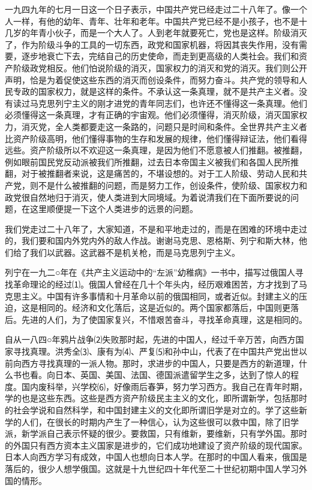 \documentclass[UTF-8, a5paper, 12pt]{ctexart}
\begin{document}
一九四九年的七月一日这一个日子表示，中国共产党已经走过二十八年了。像一个人一样，有他的幼年、青年、壮年和老年。中国共产党已经不是小孩子，也不是十几岁的年青小伙子，而是一个大人了。人到老年就要死亡，党也是这样。阶级消灭了，作为阶级斗争的工具的一切东西，政党和国家机器，将因其丧失作用，没有需要，逐步地衰亡下去，完结自己的历史使命，而走到更高级的人类社会。我们和资产阶级政党相反。他们怕说阶级的消灭，国家权力的消灭和党的消灭。我们则公开声明，恰是为着促使这些东西的消灭而创设条件，而努力奋斗。共产党的领导和人民专政的国家权力，就是这样的条件。不承认这一条真理，就不是共产主义者。没有读过马克思列宁主义的刚才进党的青年同志们，也许还不懂得这一条真理。他们必须懂得这一条真理，才有正确的宇宙观。他们必须懂得，消灭阶级，消灭国家权力，消灭党，全人类都要走这一条路的，问题只是时间和条件。全世界共产主义者比资产阶级高明，他们懂得事物的生存和发展的规律，他们懂得辩证法，他们看得远些。资产阶级所以不欢迎这一条真理，是因为他们不愿意被人们推翻。被推翻，例如眼前国民党反动派被我们所推翻，过去日本帝国主义被我们和各国人民所推翻，对于被推翻者来说，这是痛苦的，不堪设想的。对于工人阶级、劳动人民和共产党，则不是什么被推翻的问题，而是努力工作，创设条件，使阶级、国家权力和政党很自然地归于消灭，使人类进到大同境域。为着说清我们在下面所要说的问题，在这里顺便提一下这个人类进步的远景的问题。

我们党走过二十八年了，大家知道，不是和平地走过的，而是在困难的环境中走过的，我们要和国内外党内外的敌人作战。谢谢马克思、恩格斯、列宁和斯大林，他们给了我们以武器。这武器不是机关枪，而是马克思列宁主义。

列宁在一九二○年在《共产主义运动中的“左派”幼稚病》一书中，描写过俄国人寻找革命理论的经过⑴。俄国人曾经在几十个年头内，经历艰难困苦，方才找到了马克思主义。中国有许多事情和十月革命以前的俄国相同，或者近似。封建主义的压迫，这是相同的。经济和文化落后，这是近似的。两个国家都落后，中国则更落后。先进的人们，为了使国家复兴，不惜艰苦奋斗，寻找革命真理，这是相同的。

自从一八四○年鸦片战争⑵失败那时起，先进的中国人，经过千辛万苦，向西方国家寻找真理。洪秀全⑶、康有为⑷、严复⑸和孙中山，代表了在中国共产党出世以前向西方寻找真理的一派人物。那时，求进步的中国人，只要是西方的新道理，什么书也看。向日本、英国、美国、法国、德国派遣留学生之多，达到了惊人的程度。国内废科举，兴学校⑹，好像雨后春笋，努力学习西方。我自己在青年时期，学的也是这些东西。这些是西方资产阶级民主主义的文化，即所谓新学，包括那时的社会学说和自然科学，和中国封建主义的文化即所谓旧学是对立的。学了这些新学的人们，在很长的时期内产生了一种信心，认为这些很可以救中国，除了旧学派，新学派自己表示怀疑的很少。要救国，只有维新，要维新，只有学外国。那时的外国只有西方资本主义国家是进步的，它们成功地建设了资产阶级的现代国家。日本人向西方学习有成效，中国人也想向日本人学。在那时的中国人看来，俄国是落后的，很少人想学俄国。这就是十九世纪四十年代至二十世纪初期中国人学习外国的情形。
\end{document}
